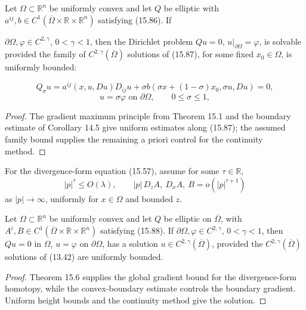\begin{theorem}\label{gilbarg-trudinger.thm.15.14.convex-domain-existence}
Let \(\Omega\subset\mathbb R^n\) be uniformly convex and let \(Q\) be elliptic
with \(a^{ij},b\in C^1(\overline\Omega\times\mathbb R\times\mathbb R^n)\)
satisfying (15.86). If


\(\partial\Omega,\varphi\in C^{2,\gamma}\), \(0<\gamma<1\), then the
Dirichlet problem \(Qu=0\), \(u|_{\partial\Omega}=\varphi\), is solvable provided
the family of \(C^{2,\gamma}(\overline\Omega)\) solutions of (15.87), for some
fixed \(x_0\in\Omega\), is uniformly bounded:

\[
\tag{15.87}
Q_\sigma u = a^{ij}(x,u,Du)D_{ij}u + \sigma b(\sigma x + (1-\sigma)x_0,\sigma u,Du)=0,
\]
\[
u=\sigma\varphi \text{ on } \partial \Omega,\qquad 0\le \sigma \le 1,
\]

\end{theorem}
\begin{proof}
\sketch The gradient maximum principle from Theorem 15.1 and the boundary
estimate of Corollary 14.5 give uniform estimates along (15.87); the assumed
family bound supplies the remaining a priori control for the continuity method.
\end{proof}

\medskip

For the divergence-form equation (15.57), assume for some \(\tau\in\mathbb R\),
\begin{equation}\tag{15.88}
|p|^\tau\le O(\lambda),\qquad
|p|\,D_zA,\ D_xA,\ B=o(|p|^{\tau+1})
\end{equation}
as \(|p|\to\infty\), uniformly for \(x\in\Omega\) and bounded \(z\).

\medskip

\begin{theorem}\label{gilbarg-trudinger.thm.15.15.convex-divergence-existence}
Let \(\Omega\subset\mathbb R^n\) be uniformly convex and let \(Q\) be elliptic
on \(\overline\Omega\), with
\(A^i,B\in C^1(\overline\Omega\times\mathbb R\times\mathbb R^n)\) satisfying
(15.88). If \(\partial\Omega,\varphi\in C^{2,\gamma}\), \(0<\gamma<1\),
then \(Qu=0\) in \(\Omega\), \(u=\varphi\) on \(\partial\Omega\), has a
solution \(u\in C^{2,\gamma}(\overline\Omega)\), provided the
\(C^{2,\gamma}(\overline\Omega)\) solutions of (13.42) are uniformly bounded.
\end{theorem}
\begin{proof}
\sketch Theorem 15.6 supplies the global gradient bound for the divergence-form
homotopy, while the convex-boundary estimate controls the boundary gradient.
Uniform height bounds and the continuity method give the solution.
\end{proof}

